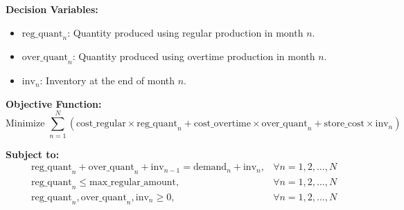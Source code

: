 \documentclass{article}
\begin{document}
\textbf{Decision Variables:}
\begin{itemize}
    \item \( \text{reg\_quant}_n \): Quantity produced using regular production in month \( n \).
    \item \( \text{over\_quant}_n \): Quantity produced using overtime production in month \( n \).
    \item \( \text{inv}_n \): Inventory at the end of month \( n \).
\end{itemize}

\textbf{Objective Function:}
\[
\text{Minimize } \sum_{n=1}^{N} \left( \text{cost\_regular} \times \text{reg\_quant}_n + \text{cost\_overtime} \times \text{over\_quant}_n + \text{store\_cost} \times \text{inv}_n \right)
\]

\textbf{Subject to:}
\begin{align*}
& \text{reg\_quant}_n + \text{over\_quant}_n + \text{inv}_{n-1} = \text{demand}_n + \text{inv}_n, & \forall n = 1, 2, \ldots, N \\
& \text{reg\_quant}_n \leq \text{max\_regular\_amount}, & \forall n = 1, 2, \ldots, N \\
& \text{reg\_quant}_n, \text{over\_quant}_n, \text{inv}_n \geq 0, & \forall n = 1, 2, \ldots, N
\end{align*}
\end{document}

